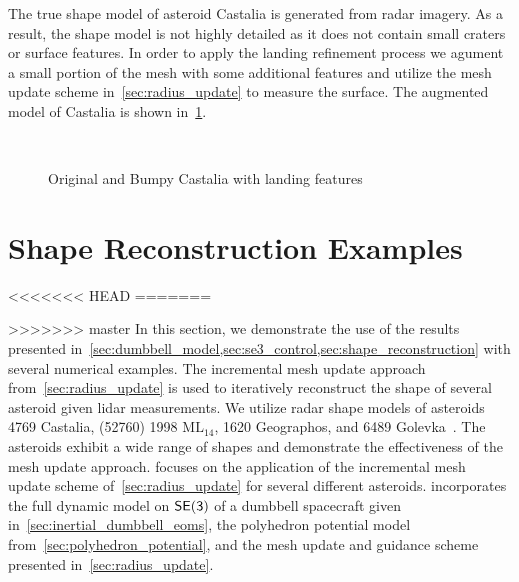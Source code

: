 The true shape model of asteroid Castalia is generated from radar imagery.
As a result, the shape model is not highly detailed as it does not contain small craters or surface features.
In order to apply the landing refinement process we agument a small portion of the mesh with some additional features and utilize the mesh update scheme in~\cref{sec:radius_update} to measure the surface.
The augmented model of Castalia is shown in~\cref{fig:bumpy_castalia}.
\begin{figure}[htbp]
    \centering
    ~
    \caption{Original and Bumpy Castalia with landing features~\label{fig:bumpy_castalia}}
\end{figure}

\section{Shape Reconstruction Examples}
<<<<<<< HEAD
=======

>>>>>>> master
In this section, we demonstrate the use of the results presented in~\cref{sec:dumbbell_model,sec:se3_control,sec:shape_reconstruction} with several numerical examples.
The incremental mesh update approach from~\cref{sec:radius_update} is used to iteratively reconstruct the shape of several asteroid given \gls{lidar} measurements.
We utilize radar shape models of asteroids \num{4769} Castalia, (\num{52760}) \num{1998} \(\text{ML}_{14}\), \num{1620} Geographos, and 6489 Golevka~\cite{neese2004}.
The asteroids exhibit a wide range of shapes and demonstrate the effectiveness of the mesh update approach.
 focuses on the application of the incremental mesh update scheme of~\cref{sec:radius_update} for several different asteroids.
 incorporates the full dynamic model on \( \mathsf{SE(3)} \) of a dumbbell spacecraft given in~\cref{sec:inertial_dumbbell_eoms}, the polyhedron potential model from~\cref{sec:polyhedron_potential}, and the mesh update and guidance scheme presented in~\cref{sec:radius_update}.

